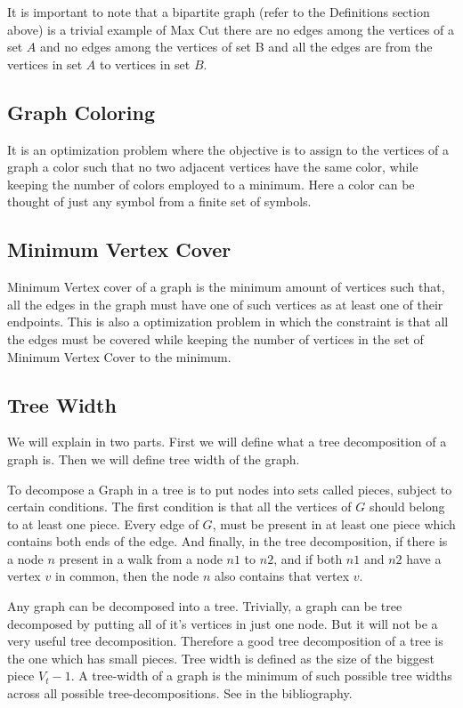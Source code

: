 It is important to note that a bipartite graph (refer to the Definitions
section above) is a trivial example of Max Cut there are no edges among the
vertices of a set $A$ and no edges among the vertices of set B and all the edges
are from the vertices in set $A$ to vertices in set $B$.

\subsection{Graph Coloring}
It is an optimization problem where the objective is to assign to the vertices
of a graph a color such that no two adjacent vertices have the same color,
while keeping the number of colors employed to a minimum. Here a color can be
thought of just any symbol from a finite set of symbols.

\subsection{Minimum Vertex Cover}
Minimum Vertex cover of a graph is the minimum amount of vertices such that,
all the edges in the graph must have one of such vertices as at least one of
their endpoints. This is also a optimization problem in which the constraint is
that all the edges must be covered while keeping the number of vertices in the
set of Minimum Vertex Cover to the minimum.

\subsection{Tree Width}
\label{explanation: treewidth}
We will explain in two parts. First we will define what a tree decomposition of
a graph is. Then we will define tree width of the graph.

To decompose a Graph in a tree is to put nodes into sets called pieces, subject
to certain conditions.  The first condition is that all the vertices of $G$
should belong to at least one piece. Every edge of $G$, must be present in
at least one piece which contains both ends of the edge.  And finally, in the
tree decomposition, if there is a node $n$ present in a walk from a node $n1$
to $n2$, and if both $n1$ and $n2$ have a vertex $v$ in common, then the node
$n$ also contains that vertex $v$. 

Any graph can be decomposed into a tree. Trivially, a graph can be tree
decomposed by putting all of it's vertices in just one node. But it will not be
a very useful tree decomposition.  Therefore a good tree decomposition of a
tree is the one which has small pieces.  Tree width is defined as the size of
the biggest piece $V_t - 1$. A tree-width of a graph is the minimum of such
possible tree widths across all possible tree-decompositions. See
\cite{KleinbergTardos06} in the bibliography.

